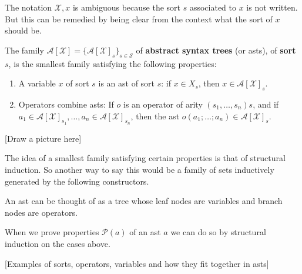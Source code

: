 \begin{remark}
    The notation $\mathcal{X},x$ is ambiguous because the sort $s$ associated to $x$ is not written. But this can be remedied by being clear from the context what the sort of $x$ should be.
\end{remark}

\begin{defin}
    The family $\mathcal{A}[\mathcal{X}]=\{ \mathcal{A}[\mathcal{X}]_s \}_{s \in \mathcal{S}}$ of \textbf{abstract syntax trees} (or asts), of \textbf{sort} $s$, is the smallest family satisfying the following properties:
    
    \begin{enumerate}
        \item A variable $x$ of sort $s$ is an ast of sort $s$: if $x \in X_s$, then $x \in \mathcal{A}[\mathcal{X}]_s$.
        
        \item Operators combine asts: If $o$ is an operator of arity $(s_1, \dots, s_n)s$, and if $a_1 \in \mathcal{A}[\mathcal{X}]_{s_1}, \dots, a_n \in \mathcal{A}[\mathcal{X}]_{s_n}$, then the ast $o(a_1;\dots; a_n) \in \mathcal{A}[\mathcal{X}]_s$.
    \end{enumerate}
\end{defin}

[Draw a picture here]

\begin{remark}
    The idea of a smallest family satisfying certain properties is that of structural induction. So another way to say this would be a family of sets inductively generated by the following constructors.
\end{remark}

\begin{remark}
    An ast can be thought of as a tree whose leaf nodes are variables and branch nodes are operators. 
\end{remark}

\begin{remark}
    When we prove properties $\mathcal{P}(a)$ of an ast $a$ we can do so by structural induction on the cases above.
\end{remark}

[Examples of sorts, operators, variables and how they fit together in asts]

